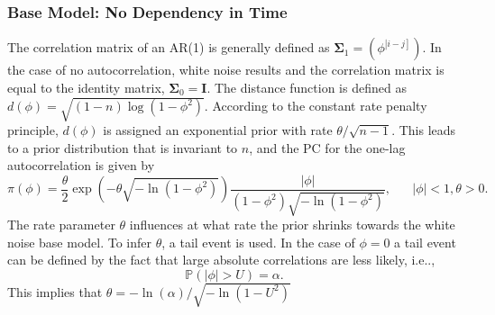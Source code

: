 \documentclass[12pt]{book}
\begin{document}
\subsubsection*{Base Model: No Dependency in Time} 
The correlation matrix of an AR(1) is generally defined as $\pmb{\Sigma}_1=\left(\phi^{\left|i-j\right]}\right)$. In the case of no autocorrelation, white noise results and the correlation matrix is equal to the identity matrix, $\pmb{\Sigma}_0=\pmb{I}$. The distance function is defined as $d\left(\phi\right)=\sqrt{\left(1-n\right)\log\left(1-\phi^2\right)}$. According to the constant rate penalty principle, $d\left(\phi\right)$ is assigned an exponential prior with rate $\theta/\sqrt{n-1}$. This leads to a prior distribution that is invariant to $n$, and the PC for the one-lag autocorrelation is given by
\begin{equation}
    \pi\left(\phi\right)=\frac{\theta}{2}\exp\left(-\theta\sqrt{-\ln\left(1-\phi^2\right)}\right)\frac{|\phi|}{\left(1-\phi^2\right)\sqrt{-\ln\left(1-\phi^2\right)}}, \hspace{20pt} |\phi|<1,\theta>0.
\end{equation}
The rate parameter $\theta$ influences at what rate the prior shrinks towards the white noise base model. To infer $\theta$, a tail event is used. In the case of $\phi = 0$ a tail event can be defined by the fact that large absolute correlations are less likely, i.e..,
\begin{equation*}
    \mathbb{P}\left(|\phi|>U\right) = \alpha.
\end{equation*}
This implies that $\theta=-\ln\left(\alpha\right)/\sqrt{-\ln\left(1-U^2\right)}$
\end{document}
